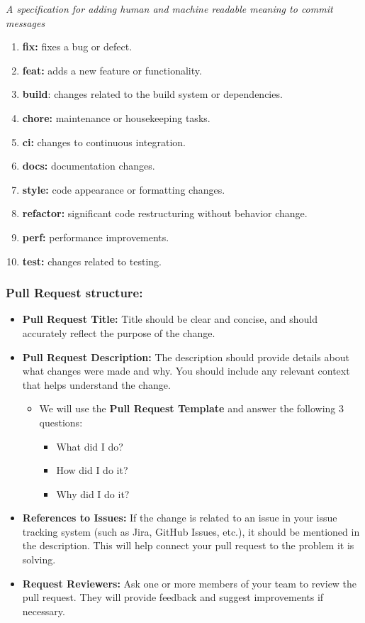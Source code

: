 \documentclass{article}
\providecommand{\tightlist}{
  \setlength{\itemsep}{0pt}\setlength{\parskip}{0pt}}
\begin{document}
\emph{A specification for adding human and machine readable meaning to
commit messages}

\begin{enumerate}
\tightlist
\item
  \textbf{fix:} fixes a bug or defect.
\item
  \textbf{feat:} adds a new feature or functionality.
\item
  \textbf{build}: changes related to the build system or dependencies.
\item
  \textbf{chore:} maintenance or housekeeping tasks.
\item
  \textbf{ci:} changes to continuous integration.
\item
  \textbf{docs:} documentation changes.
\item
  \textbf{style:} code appearance or formatting changes.
\item
  \textbf{refactor:} significant code restructuring without behavior
  change.
\item
  \textbf{perf:} performance improvements.
\item
  \textbf{test:} changes related to testing.
\end{enumerate}

\hypertarget{pullrequeststructurenbsp}{
\subsubsection{Pull Request
structure:~}\label{pullrequeststructurenbsp}}

\begin{itemize}
\tightlist
\item
  \textbf{Pull Request Title:} Title should be clear and concise, and
  should accurately reflect the purpose of the change.
\item
  \textbf{Pull Request Description:} The description should provide
  details about what changes were made and why. You should include any
  relevant context that helps understand the change.

  \begin{itemize}
  \tightlist
  \item
    We will use the \textbf{Pull Request Template} and answer the
    following 3 questions:

    \begin{itemize}
    \tightlist
    \item
      What did I do?
    \item
      How did I do it?
    \item
      Why did I do it?
    \end{itemize}
  \end{itemize}
\item
  \textbf{References to Issues:} If the change is related to an issue in
  your issue tracking system (such as Jira, GitHub Issues, etc.), it
  should be mentioned in the description. This will help connect your
  pull request to the problem it is solving.
\item
  \textbf{Request Reviewers:} Ask one or more members of your team to
  review the pull request. They will provide feedback and suggest
  improvements if necessary.
\end{itemize}
\end{document}
